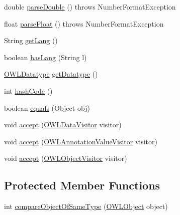 \begin{DoxyCompactItemize}
\item 
double \hyperlink{classuk_1_1ac_1_1manchester_1_1cs_1_1owl_1_1owlapi_1_1_o_w_l_literal_impl_ac120fc0e46af4569dfa4d14ee2ef3a22}{parse\-Double} ()  throws Number\-Format\-Exception 
\item 
float \hyperlink{classuk_1_1ac_1_1manchester_1_1cs_1_1owl_1_1owlapi_1_1_o_w_l_literal_impl_afdb80e5985182a81e5b6f8bd7ee5d9eb}{parse\-Float} ()  throws Number\-Format\-Exception 
\item 
String \hyperlink{classuk_1_1ac_1_1manchester_1_1cs_1_1owl_1_1owlapi_1_1_o_w_l_literal_impl_a09e34ee953c84db12da57decdf2f2377}{get\-Lang} ()
\item 
boolean \hyperlink{classuk_1_1ac_1_1manchester_1_1cs_1_1owl_1_1owlapi_1_1_o_w_l_literal_impl_a49cddb0331bb0e50d3fe22de4761e5cf}{has\-Lang} (String l)
\item 
\hyperlink{interfaceorg_1_1semanticweb_1_1owlapi_1_1model_1_1_o_w_l_datatype}{O\-W\-L\-Datatype} \hyperlink{classuk_1_1ac_1_1manchester_1_1cs_1_1owl_1_1owlapi_1_1_o_w_l_literal_impl_a1d4ee86f483ccb588082d8f7b66d403b}{get\-Datatype} ()
\item 
int \hyperlink{classuk_1_1ac_1_1manchester_1_1cs_1_1owl_1_1owlapi_1_1_o_w_l_literal_impl_a968bfccd0dc7eb55744f722090fedc73}{hash\-Code} ()
\item 
boolean \hyperlink{classuk_1_1ac_1_1manchester_1_1cs_1_1owl_1_1owlapi_1_1_o_w_l_literal_impl_a003fef8ae5c8069ae6b78533ac001e4c}{equals} (Object obj)
\item 
void \hyperlink{classuk_1_1ac_1_1manchester_1_1cs_1_1owl_1_1owlapi_1_1_o_w_l_literal_impl_af65ee8b23f0ae86cd758e15968916fdd}{accept} (\hyperlink{interfaceorg_1_1semanticweb_1_1owlapi_1_1model_1_1_o_w_l_data_visitor}{O\-W\-L\-Data\-Visitor} visitor)
\item 
void \hyperlink{classuk_1_1ac_1_1manchester_1_1cs_1_1owl_1_1owlapi_1_1_o_w_l_literal_impl_a53e2e4f518ccdc2442583a450ba1f207}{accept} (\hyperlink{interfaceorg_1_1semanticweb_1_1owlapi_1_1model_1_1_o_w_l_annotation_value_visitor}{O\-W\-L\-Annotation\-Value\-Visitor} visitor)
\item 
void \hyperlink{classuk_1_1ac_1_1manchester_1_1cs_1_1owl_1_1owlapi_1_1_o_w_l_literal_impl_a37c61b9a3165f5ae4a3efd157d519470}{accept} (\hyperlink{interfaceorg_1_1semanticweb_1_1owlapi_1_1model_1_1_o_w_l_object_visitor}{O\-W\-L\-Object\-Visitor} visitor)
\end{DoxyCompactItemize}
\subsection*{Protected Member Functions}
\begin{DoxyCompactItemize}
\item 
int \hyperlink{classuk_1_1ac_1_1manchester_1_1cs_1_1owl_1_1owlapi_1_1_o_w_l_literal_impl_af0e160a15878adbbb5dbd19be87b86b0}{compare\-Object\-Of\-Same\-Type} (\hyperlink{interfaceorg_1_1semanticweb_1_1owlapi_1_1model_1_1_o_w_l_object}{O\-W\-L\-Object} object)
\end{DoxyCompactItemize}
